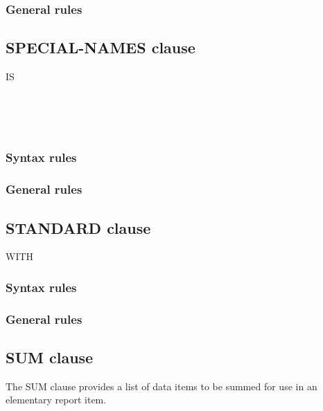 \subsubsection{General rules}

\subsection{SPECIAL-NAMES clause}

\begin{syntax}[\miscextcolour]
  IS 
  \begin{1=}
     \\
     \\
     \\
  \end{1=}
\end{syntax}

\subsubsection{Syntax rules}

\subsubsection{General rules}

\subsection{STANDARD clause}

\begin{syntax}[\miscextcolour]
  WITH 
\end{syntax}

\subsubsection{Syntax rules}

\subsubsection{General rules}

\subsection{SUM clause}

The SUM clause provides a list of data items to be summed for use in an elementary report item.

